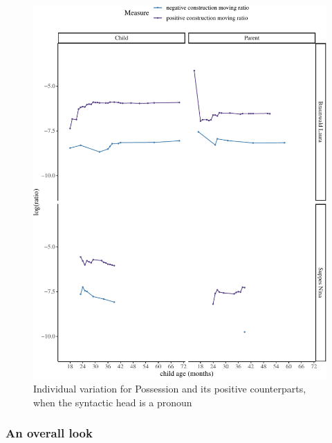 \documentclass[
  english,
  man,floatsintext]{apa6}
\begin{document}
\begin{figure}[H]

{\centering \includegraphics{neg_construction_article_files/figure-latex/individualpossessionpro-1} 

}

\caption{Individual variation for Possession and its positive counterparts, when the syntactic head is a pronoun}\label{fig:individualpossessionpro}
\end{figure}

\clearpage

\hypertarget{an-overall-look}{%
\subsubsection{An overall look}\label{an-overall-look}}
\end{document}
